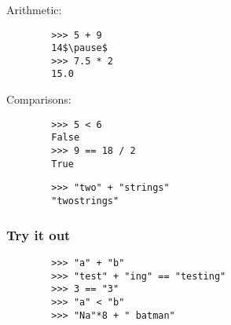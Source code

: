 \documentclass[notes]{beamer}
\begin{document}
\begin{frame}[fragile]
\begin{itemize}
			
			
			
		\end{itemize}
	\end{frame}
	
	\begin{frame}[fragile]
		\frametitle{}
		
		Arithmetic:
		
		\begin{lstlisting}
		>>> 5 + 9
		14$\pause$
		>>> 7.5 * 2
		15.0
		\end{lstlisting}
		
		\pause
		
		Comparisons:
		
		\begin{lstlisting}
		>>> 5 < 6
		False
		>>> 9 == 18 / 2
		True
		\end{lstlisting}
		
		\pause
		
		\begin{lstlisting}
		>>> "two" + "strings"
		"twostrings" 
		\end{lstlisting}
	\end{frame}
	
	\begin{frame}[fragile]
		\frametitle{Try it out}
		
		\begin{lstlisting}
		>>> "a" + "b"
		>>> "test" + "ing" == "testing"
		>>> 3 == "3"
		>>> "a" < "b"
		>>> "Na"*8 + " batman"
		\end{lstlisting}
	\end{frame}
	
\end{document}
